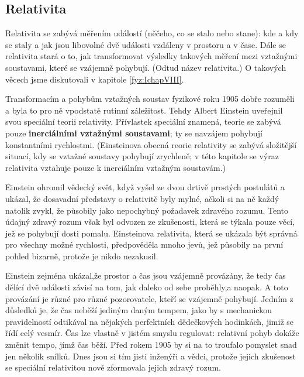       \subsection{Relativita}
        Relativita se zabývá měřením událostí (něčeho, co se stalo nebo stane): kde a kdy se staly a
        jak jsou libovolné dvě události vzdáleny v prostoru a v čase. Dále se relativita stará o to,
        jak transformovat výsledky takových měření mezi vztažnými soustavami, které se vzájemně
        pohybují. (Odtud název relativita.) O takových věcech jsme diskutovali v kapitole
        \ref{fyz:IchapVIII}.

        Transformacím a pohybům vztažných soustav fyzikové roku 1905 dobře rozuměli a byla to pro ně
        vpodstatě rutinní záležitost. Tehdy Albert Einstein uveřejnil svou speciální teorii
        relativity. Přívlastek speciální znamená, teorie se zabývá pouze \textbf{inerciálními
        vztažnými soustavami}; ty se navzájem pohybují konstantními rychlostmi. (Einsteinova obecná
        reorie relativity se zabývá složitější situací, kdy se vztažné soustavy pohybují zrychleně;
        v této kapitole se výraz relativita vztahuje pouze k inerciálním vztažným soustavám.)
        
        Einstein ohromil vědecký svět, když vyšel ze dvou drtivě prostých postulátů a ukázal, že
        dosavadní představy o relativitě byly mylné, ačkoli si na ně každý natolik zvykl, že
        působily jako nepochybný požadavek zdravého rozumu. Tento údajný zdravý rozum však byl
        odvozen ze zkušenosti, která se týkala pouze věcí, jež se pohybují dosti pomalu. Einsteinova
        relativita, která se ukázala být správná pro všechny možné rychlosti, předpověděla mnoho
        jevů, jež působily na první pohled bizarně, protože je nikdo nezakusil.

        Einstein zejména ukázal,že prostor a čas jsou vzájemně provázány, že tedy čas dělící dvě
        události závisí na tom, jak daleko od sebe proběhly,a naopak. A toto provázání je různé pro
        různé pozorovatele, kteří se vzájemně pohybují. Jedním z důsledků je, že čas neběží jediným
        daným tempem, jako by s mechanickou pravidelností odtikával na nějakých perfektních
        dědečkových hodinkách, jimiž se řídí celý vesmír. Čas lze vlastně v jistém smyslu regulovat:
        relativní pohyb dokáže změnit tempo, jímž čas běží. Před rokem 1905 by si na to troufalo
        pomyslet snad jen několik snílků. Dnes jsou si tím jisti inženýři a vědci, protože jejich
        zkušenost se speciální relativitou nově zformovala jejich zdravý rozum.
      
